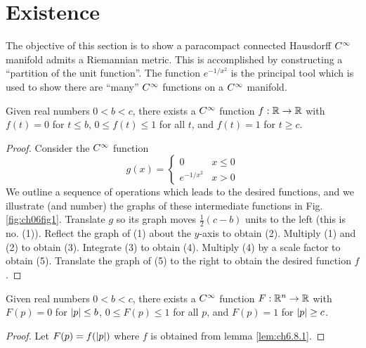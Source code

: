 \documentclass[../main]{subfiles}
\begin{document}
\section{Existence}\label{ch06:s8}

The objective of this section is to show a paracompact connected Hausdorff $C^\infty$ manifold admits a Riemannian metric. This is accomplished by constructing a ``partition of the unit function''. The function $e^{-1/x^2}$ is the principal tool which is used to show there are ``many'' $C^\infty$ functions on a $C^\infty$ manifold.


\begin{lemma} \label{lem:ch6.8.1}
Given real numbers $0<b<c$, there exists a $C^\infty$ function $f:\mathbb{R}\to\mathbb{R}$ with $f(t)=0$ for $t\le b$, $0\le f(t)\le 1$ for all $t$, and $f(t)=1$ for $t\ge c$.
\end{lemma}

\begin{proof}
Consider the $C^\infty$ function
\[g(x) =
\begin{cases}
    0 & x\le 0 \\
    e^{-1/x^2} & x>0
\end{cases}
\]
We outline a sequence of operations which leads to the desired functions, and we illustrate (and number) the graphs of these intermediate functions in Fig. \ref{fig:ch06fig1}. Translate $g$ so its graph moves $\frac12(c-b)$ units to the left (this is no. (1)). Reflect the graph of (1) about the $y$-axis to obtain (2). Multiply (1) and (2) to obtain (3). Integrate (3) to obtain (4). Multiply (4) by a scale factor to obtain (5). Translate the graph of (5) to the right to obtain the desired function $f$.
\end{proof}








\begin{lemma} \label{lem:ch6.8.2}
Given real numbers $0<b<c$, there exists a $C^\infty$ function \newline $F:\mathbb{R}^n\to\mathbb{R}$ with $F(p)=0$ for $\left|p\right|\le b$, $0\le F(p)\le 1$ for all $p$, and $F(p)=1$ for $\left|p\right|\ge c$.
\end{lemma}

\begin{proof}
Let $F(p)=f(\left|p\right|)$ where $f$ is obtained from lemma \ref{lem:ch6.8.1}.
\end{proof}
\end{document}
